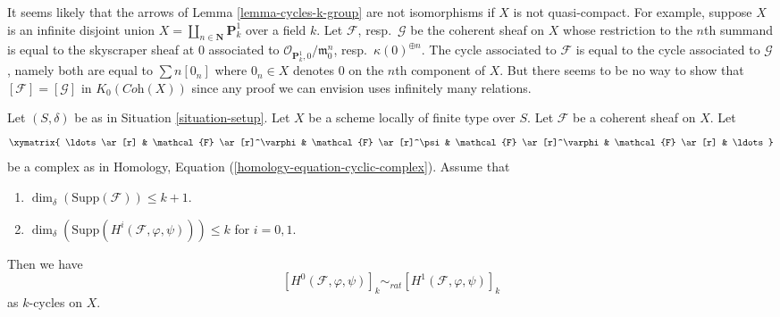 \begin{remark}
\label{remark-not-true-not-quasi-compact}
It seems likely that the arrows of Lemma \ref{lemma-cycles-k-group}
are not isomorphisms if $X$ is not quasi-compact. For example, suppose $X$ is
an infinite disjoint union $X = \coprod_{n \in \mathbf{N}} \mathbf{P}^1_k$
over a field $k$. Let $\mathcal{F}$, resp.\ $\mathcal{G}$ be the coherent
sheaf on $X$ whose restriction to the $n$th summand is equal to the skyscraper
sheaf at $0$ associated to $\mathcal{O}_{\mathbf{P}^1_k, 0}/\mathfrak m_0^n$,
resp.\ $\kappa(0)^{\oplus n}$. The cycle associated to $\mathcal{F}$ is
equal to the cycle associated to $\mathcal{G}$, namely both are equal to
$\sum n[0_n]$ where $0_n \in X$ denotes $0$ on the $n$th component of $X$.
But there seems to be no way to show that
$[\mathcal{F}] = [\mathcal{G}]$ in $K_0(\textit{Coh}(X))$ since
any proof we can envision uses infinitely many relations.
\end{remark}

\begin{lemma}
\label{lemma-maps-between-coherent-sheaves}
Let $(S, \delta)$ be as in Situation \ref{situation-setup}.
Let $X$ be a scheme locally of finite type over $S$.
Let $\mathcal{F}$ be a coherent sheaf on $X$.
Let
$$
\xymatrix{
\ldots \ar[r] &
\mathcal{F} \ar[r]^\varphi &
\mathcal{F} \ar[r]^\psi &
\mathcal{F} \ar[r]^\varphi &
\mathcal{F} \ar[r] & \ldots
}
$$
be a complex as in Homology, Equation (\ref{homology-equation-cyclic-complex}).
Assume that
\begin{enumerate}
\item $\dim_\delta(\text{Supp}(\mathcal{F})) \leq k + 1$.
\item $\dim_\delta(\text{Supp}(H^i(\mathcal{F}, \varphi, \psi))) \leq k$
for $i = 0, 1$.
\end{enumerate}
Then we have
$$
[H^0(\mathcal{F}, \varphi, \psi)]_k
\sim_{rat}
[H^1(\mathcal{F}, \varphi, \psi)]_k
$$
as $k$-cycles on $X$.
\end{lemma}

